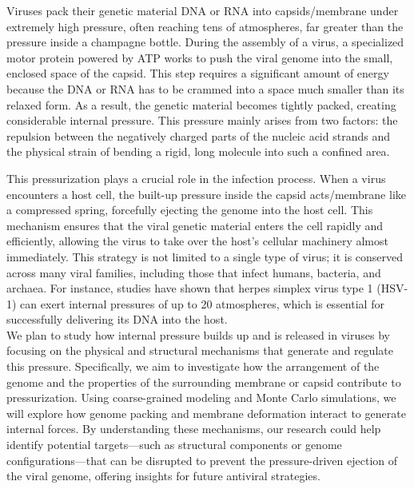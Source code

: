 \documentclass[12pt]{article}
\begin{document}
\begin{flushleft}

Viruses pack their genetic material DNA or RNA into capsids/membrane under extremely high pressure, often reaching tens of atmospheres, far greater than the pressure inside a champagne bottle. During the assembly of a virus, a specialized motor protein powered by ATP works to push the viral genome into the small, enclosed space of the capsid. This step requires a significant amount of energy because the DNA or RNA has to be crammed into a space much smaller than its relaxed form. As a result, the genetic material becomes tightly packed, creating considerable internal pressure. This pressure mainly arises from two factors: the repulsion between the negatively charged parts of the nucleic acid strands and the physical strain of bending a rigid, long molecule into such a confined area.\cite{BrandarizNunez2019}




This pressurization plays a crucial role in the infection process. When a virus encounters a host cell, the built-up pressure inside the capsid acts/membrane like a compressed spring, forcefully ejecting the genome into the host cell. This mechanism ensures that the viral genetic material enters the cell rapidly and efficiently, allowing the virus to take over the host’s cellular machinery almost immediately. This strategy is not limited to a single type of virus; it is conserved across many viral families, including those that infect humans, bacteria, and archaea. For instance, studies have shown that herpes simplex virus type 1 (HSV-1) can exert internal pressures of up to 20 atmospheres, which is essential for successfully delivering its DNA into the host\cite{BrandarizNunez2019}.\\

We plan to study how internal pressure builds up and is released in viruses by focusing on the physical and structural mechanisms that generate and regulate this pressure. Specifically, we aim to investigate how the arrangement of the genome and the properties of the surrounding membrane or capsid contribute to pressurization. Using coarse-grained modeling and Monte Carlo simulations, we will explore how genome packing and membrane deformation interact to generate internal forces. By understanding these mechanisms, our research could help identify potential targets—such as structural components or genome configurations—that can be disrupted to prevent the pressure-driven ejection of the viral genome, offering insights for future antiviral strategies.



\end{flushleft}
\end{document}
